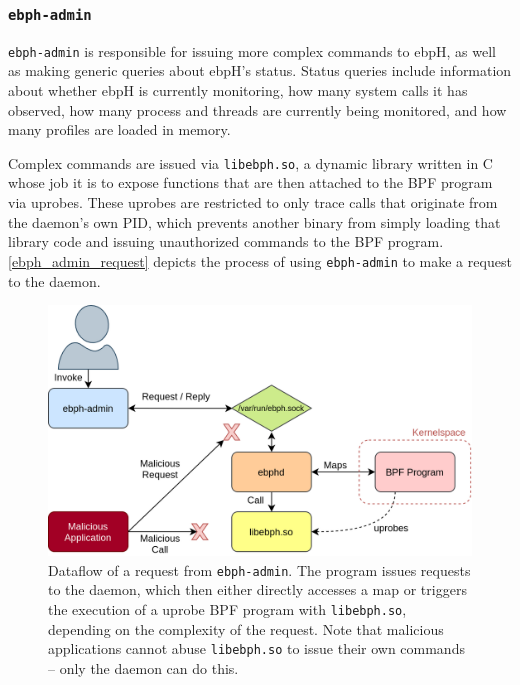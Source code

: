\documentclass[
  12pt]{findlay}
\newcommand{\passthrough}[1]{#1}
\begin{document}

\hypertarget{ebph-admin}{%
\subsubsection{\texorpdfstring{\texttt{ebph-admin}}{ebph-admin}}\label{ebph-admin}}

\label{ebph_admin_sec}

\passthrough{\lstinline!ebph-admin!} is responsible for issuing more
complex commands to ebpH, as well as making generic queries about ebpH's
status. Status queries include information about whether ebpH is
currently monitoring, how many system calls it has observed, how many
process and threads are currently being monitored, and how many profiles
are loaded in memory.

Complex commands are issued via \passthrough{\lstinline!libebph.so!}, a
dynamic library written in C whose job it is to expose functions that
are then attached to the BPF program via uprobes. These uprobes are
restricted to only trace calls that originate from the daemon's own PID,
which prevents another binary from simply loading that library code and
issuing unauthorized commands to the BPF program.
\autoref{ebph_admin_request} depicts the process of using
\passthrough{\lstinline!ebph-admin!} to make a request to the daemon.

\begin{figure}
    \caption[Dataflow of a request from \texttt{ebph-admin}]{
        Dataflow of a request from \texttt{ebph-admin}.
        The program issues requests to the daemon, which then either
        directly accesses a map or triggers the execution of a uprobe
        BPF program with \texttt{libebph.so}, depending on the complexity
        of the request. Note that malicious applications cannot abuse \texttt{libebph.so}
        to issue their own commands -- only the daemon can do this.
    }
    \label{ebph_admin_request}
    \includegraphics[width=.8\textwidth]{../figures/ebph-admin.png}
\end{figure}
\end{document}
